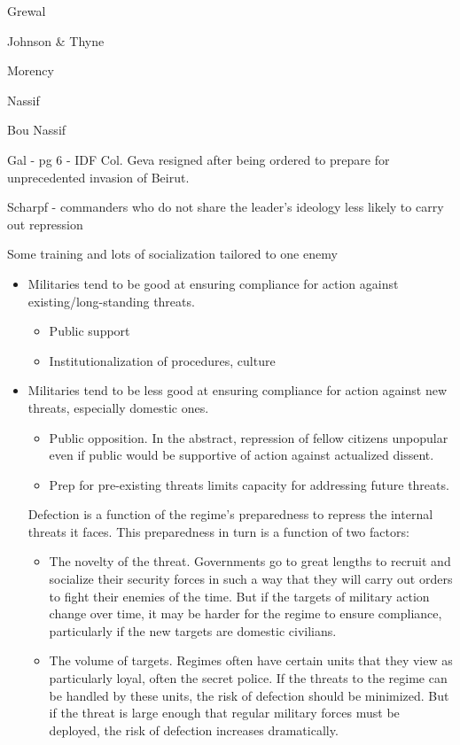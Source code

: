 \documentclass[
  12pt,
]{article}
\providecommand{\tightlist}{%
  \setlength{\itemsep}{0pt}\setlength{\parskip}{0pt}}
\begin{document}
Grewal

Johnson \& Thyne

Morency

Nassif

Bou Nassif

Gal - pg 6 - IDF Col. Geva resigned after being ordered to prepare for unprecedented invasion of Beirut.

Scharpf - commanders who do not share the leader's ideology less likely to carry out repression

Some training and lots of socialization tailored to one enemy

\begin{itemize}
\item
  Militaries tend to be good at ensuring compliance for action against existing/long-standing threats.

  \begin{itemize}
  \tightlist
  \item
    Public support
  \item
    Institutionalization of procedures, culture
  \end{itemize}
\item
  Militaries tend to be less good at ensuring compliance for action against new threats, especially domestic ones.

  \begin{itemize}
  \tightlist
  \item
    Public opposition. In the abstract, repression of fellow citizens unpopular even if public would be supportive of action against actualized dissent.
  \item
    Prep for pre-existing threats limits capacity for addressing future threats.
  \end{itemize}

  Defection is a function of the regime's preparedness to repress the internal threats it faces. This preparedness in turn is a function of two factors:

  \begin{itemize}
  \tightlist
  \item
    The novelty of the threat. Governments go to great lengths to recruit and socialize their security forces in such a way that they will carry out orders to fight their enemies of the time. But if the targets of military action change over time, it may be harder for the regime to ensure compliance, particularly if the new targets are domestic civilians.
  \item
    The volume of targets. Regimes often have certain units that they view as particularly loyal, often the secret police. If the threats to the regime can be handled by these units, the risk of defection should be minimized. But if the threat is large enough that regular military forces must be deployed, the risk of defection increases dramatically.
  \end{itemize}
\end{itemize}
\end{document}

